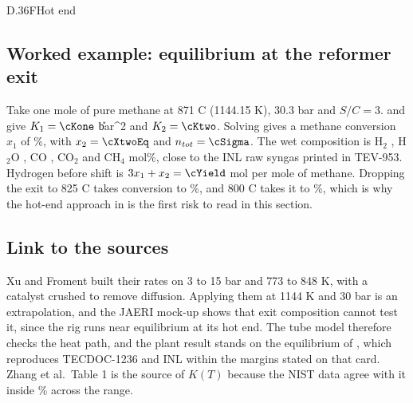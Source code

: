 \begin{eqcard}{D.36}{F}{Hot end}
\end{eqcard}

\subsection*{Worked example: equilibrium at the reformer exit}
Take one mole of pure methane at 871 C (1144.15 K), 30.3 bar and $S/C=3$.  and  give $K_1=\cKone$ \U{bar^2} and $K_2=\cKtwo$. Solving  gives a methane conversion $x_1$ of \cXeq\%, with $x_2=\cXtwoEq$ and $n_{tot}=\cSigma$. The wet composition is H$_2$ \cyH, H$_2$O \cyHO, CO \cyCO, CO$_2$ \cyCOtwo{} and CH$_4$ \cyCH{} mol\%, close to the INL raw syngas printed in TEV-953. Hydrogen before shift is $3x_1+x_2=\cYield$ mol per mole of methane. Dropping the exit to 825 C takes conversion to \cXEighteen\%, and 800 C takes it to \cXEight\%, which is why the hot-end approach in  is the first risk to read in this section.

\subsection*{Link to the sources}
Xu and Froment built their rates on 3 to 15 bar and 773 to 848 K, with a catalyst crushed to remove diffusion. Applying them at 1144 K and 30 bar is an extrapolation, and the JAERI mock-up shows that exit composition cannot test it, since the rig runs near equilibrium at its hot end. The tube model therefore checks the heat path, and the plant result stands on the equilibrium of , which reproduces TECDOC-1236 and INL within the margins stated on that card. Zhang et al.\ Table 1 is the source of $K(T)$ because the NIST data agree with it inside \cKoneDevMax\% across the range.
